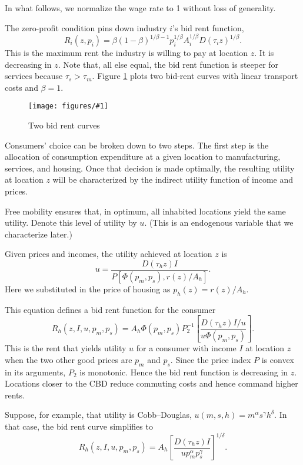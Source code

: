 \documentclass[12pt]{article}
\newcommand{\dofigure}[2]{\begin{figure}
\begin{centering}
\texttt{[image: figures/\#1]}
  \caption{#2\label{fig:#1}}
\end{centering}
\end{figure}}
\begin{document}
In what follows, we normalize the wage rate to 1 without loss of generality.

The zero-profit condition pins down industry $i$'s bid rent function,
\begin{equation}\label{eq:bidrent:industry}
R_i(z,p_i) = \beta (1-\beta)^{1/\beta-1} p_i^{1/\beta} A_i^{1/\beta} D(\tau_i z)^{1/\beta}.
\end{equation}
This is the maximum rent the industry is willing to pay at location $z$. It is decreasing in $z$. Note that, all else equal, the bid rent function is steeper for services because $\tau_s>\tau_m$. Figure \ref{fig:bid-rent-2} plots two bid-rent curves with linear transport costs and $\beta=1$.

\dofigure{bid-rent-2}{Two bid rent curves}

\bigskip

Consumers' choice can be broken down to two steps. The first step is the allocation of consumption expenditure at a given location to manufacturing, services, and housing. Once that decision is made optimally, the resulting utility at location $z$ will be characterized by the indirect utility function of income and prices.

Free mobility ensures that, in optimum, all inhabited locations yield the same utility. Denote this level of utility by $u$. (This is an endogenous variable that we characterize later.)

Given prices and incomes, the utility achieved at location $z$ is
    \[
    u = \frac{D(\tau_h z) I}{P[\Phi(p_m,p_s),r(z)/A_h]}.
    \]
Here we substituted in the price of housing as $p_h(z) = r(z)/A_h$.

This equation defines a bid rent function for the consumer
\begin{equation}\label{eq:bidrent:hh}
R_h(z,I,u,p_m,p_s) = A_h\Phi(p_m,p_s)P_2^{-1}\left[\frac{D(\tau_h z) I/u}{u\Phi(p_m,p_s)}\right].
\end{equation}
This is the rent that yields utility $u$ for a consumer with income $I$ at location $z$ when the two other good prices are $p_m$ and $p_s$. Since the price index $P$ is convex in its arguments, $P_2$ is monotonic. Hence the bid rent function is decreasing in $z$. Locations closer to the CBD reduce commuting costs and hence command higher rents.

Suppose, for example, that utility is Cobb--Douglas, $u(m,s,h) = m^\alpha s^\gamma h^\delta$. In that case, the bid rent curve simplifies to
\[
R_h(z,I,u,p_m,p_s) = A_h\left[\frac{D(\tau_h z) I}{up_m^{\alpha}p_s^{\gamma}}\right]^{1/\delta}.
\]
\end{document}
